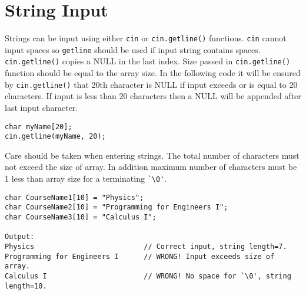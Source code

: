 \documentclass[12pt,a4paper]{article}
\begin{document}
\section{String Input}
Strings can be input using either \texttt{cin} or \texttt{cin.getline()} functions. \texttt{cin} cannot input spaces so \texttt{getline} should be used if input string contains spaces. \verb|cin.getline()| copies a NULL in the last index. Size passed in \verb|cin.getline()| function should be equal to the array size. In the following code it will be ensured by \verb|cin.getline()| that 20th character is NULL if input exceeds or is equal to 20 characters. If input is less than 20 characters then a NULL will be appended after last input character.
\begin{lstlisting}[caption={String input using cin.getline()}]
char myName[20];
cin.getline(myName, 20);
\end{lstlisting}
Care should be taken when entering strings. The total number of characters must not exceed the size of array. In addition maximum number of characters must be 1 less than array size for a terminating \verb|`\0'|.
\begin{lstlisting}[caption={String size and NULL}]
char CourseName1[10] = "Physics";
char CourseName2[10] = "Programming for Engineers I";
char CourseName3[10] = "Calculus I";

Output:
Physics                          // Correct input, string length=7.
Programming for Engineers I      // WRONG! Input exceeds size of array.
Calculus I                       // WRONG! No space for `\0', string length=10.
\end{lstlisting}
\end{document}
